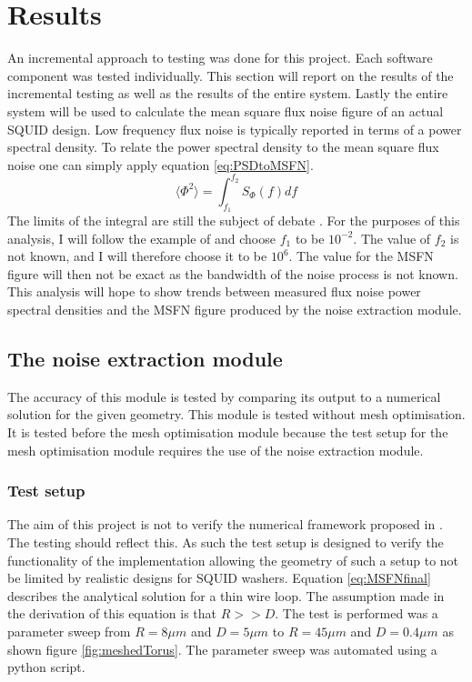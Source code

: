 \graphicspath{{results/fig/}}

\chapter{Results}
\label{chap:results}
An incremental approach to testing was done for this project. Each software component was tested individually. This section will report on the results of the incremental testing as well as the results of the entire system. Lastly the entire system will be used to calculate the mean square flux noise figure of an actual SQUID design. Low frequency flux noise is typically reported in terms of a power spectral density. To relate the power spectral density to the mean square flux noise one can simply apply equation \ref{eq:PSDtoMSFN}.
\begin{equation}
    \langle \Phi^2 \rangle = \int_{f_1}^{f_2}S_\Phi (f) df
    \label{eq:PSDtoMSFN}
\end{equation} 
The limits of the integral are still the subject of debate \cite{fluxNoiseSquidsStevenAnton}. For the purposes of this analysis, I will follow the example of \cite{fluxNoiseSquidsStevenAnton} and choose $f_1$ to be $10^{-2}$. The value of $f_2$ is not known, and I will therefore choose it to be $10^6$. The value for the MSFN figure will then not be exact as the bandwidth of the noise process is not known. This analysis will hope to show trends between measured flux noise power spectral densities and the MSFN figure produced by the noise extraction module.
\section{The noise extraction module}
The accuracy of this module is tested by comparing its output to a numerical solution for the given geometry. This module is tested without mesh optimisation. It is tested before the mesh optimisation module because the test setup for the mesh optimisation module requires the use of the noise extraction module.
\subsection{Test setup}
The aim of this project is not to verify the numerical framework proposed in \cite{fluxNoiseSquidsStevenAnton}. The testing should reflect this. As such the test setup is designed to verify the functionality of the implementation allowing the geometry of such a setup to not be limited by realistic designs for SQUID washers. Equation \ref{eq:MSFNfinal} describes the analytical solution for a thin wire loop. The assumption made in the derivation of this equation is that $R >> D$. The test is performed was a parameter sweep from $R = \si{8}{\mu m}$ and $D = \si{5}{\mu m}$ to $R = \si{45}{\mu m}$ and $D = \si{0.4}{\mu m}$ as shown figure \ref{fig:meshedTorus}. The parameter sweep was automated using a python script.

